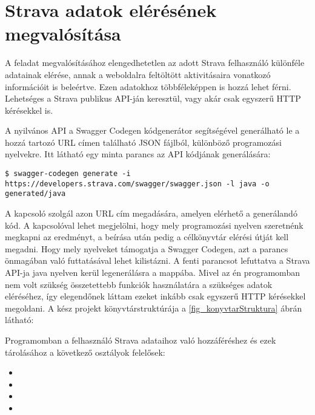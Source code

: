 \section{Strava adatok elérésének megvalósítása}

A feladat megvalósításához elengedhetetlen az adott Strava felhasználó különféle adatainak elérése, annak a weboldalra feltöltött aktivitásaira vonatkozó információit is beleértve.
Ezen adatokhoz többféleképpen is hozzá lehet férni.
Lehetséges a Strava publikus API-ján keresztül, vagy akár csak egyszerű HTTP kérésekkel is. 

A nyilvános API a Swagger Codegen kódgenerátor segítségével generálható le a hozzá tartozó URL címen található JSON fájlból, különböző programozási nyelvekre.
Itt látható egy minta parancs az API kódjának generálására: 

\begin{verbatim}
$ swagger-codegen generate -i https://developers.strava.com/swagger/swagger.json -l java -o generated/java 
\end{verbatim}

A  kapcsoló szolgál azon URL cím megadására, amelyen elérhető a generálandó kód.
A  kapcsolóval lehet megjelölni, hogy mely programozási nyelven szeretnénk megkapni az eredményt, a  beírása után pedig a célkönyvtár elérési útját kell megadni.
Hogy mely nyelveket támogatja a Swagger Codegen, azt a  parancs önmagában való futtatásával lehet kilistázni.
A fenti parancsot lefuttatva a Strava API-ja java nyelven kerül legenerálásra a  mappába.
Mivel az én programomban nem volt szükség összetettebb funkciók használatára a szükséges adatok eléréséhez, így elegendőnek láttam ezeket inkább csak egyszerű HTTP kérésekkel megoldani.
A kész projekt könyvtárstruktúrája a \ref{fig_konyvtarStruktura} ábrán látható: 



Programomban a felhasználó Strava adataihoz való hozzáféréshez és ezek tárolásához a következő osztályok felelősek: 

\begin{itemize}
\item {}
\item {}
\item {}
\item {}
\end{itemize}
 

